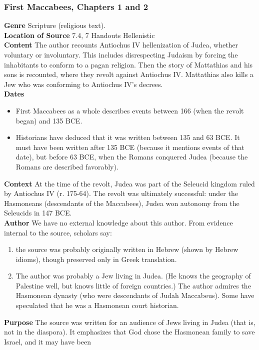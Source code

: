 \documentclass{article}
\begin{document}
\subsubsection*{First Maccabees, Chapters 1 and 2}
\textbf{Genre}
Scripture (religious text). \\
\textbf{Location of Source}
7.4, 7 Handouts Hellenistic \\
\textbf{Content}
The author recounts Antiochus IV hellenization of Judea, whether voluntary or involuntary.
This includes disrespecting Judaism by forcing the inhabitants to conform to a pagan religion.
Then the story of Mattathias and his sons is recounted, where they revolt against Antiochus IV.
Mattathias also kills a Jew who was conforming to Antiochus IV's decrees. \\
\textbf{Dates}
\begin{itemize}
  \item First Maccabees as a whole describes events between 166 (when the revolt began)
  and 135 BCE.
  \item Historians have deduced that it was written between 135 and 63 BCE.  It must have
  been written after 135 BCE (because it mentions events of that date), but before 63 BCE,
  when the Romans conquered Judea (because the Romans are described favorably).
\end{itemize}
\textbf{Context}
At the time of the revolt, Judea was part of the Seleucid kingdom ruled by Antiochus IV
(r. 175-64). The revolt was ultimately successful:  under the Hasmoneans (descendants
of the Maccabees), Judea won autonomy from the Seleucids in 147 BCE. \\
\textbf{Author}
We have no external knowledge about this author. From evidence internal to the source, scholars say:
\begin{enumerate}
  \item the source was probably originally written in Hebrew (shown by Hebrew idioms),
  though preserved only in Greek translation.
  \item The author was probably a Jew living in Judea. (He knows the geography of Palestine
  well, but knows little of foreign countries.)  The author admires the Hasmonean dynasty
  (who were descendants of Judah Maccabeus).  Some have speculated that he was a
  Hasmonean court historian.
\end{enumerate}
\textbf{Purpose}
The source was written for an audience of Jews living in Judea (that is, not in the diaspora).
It emphasizes that God chose the Hasmonean family to save Israel, and it may have been
\end{document}
